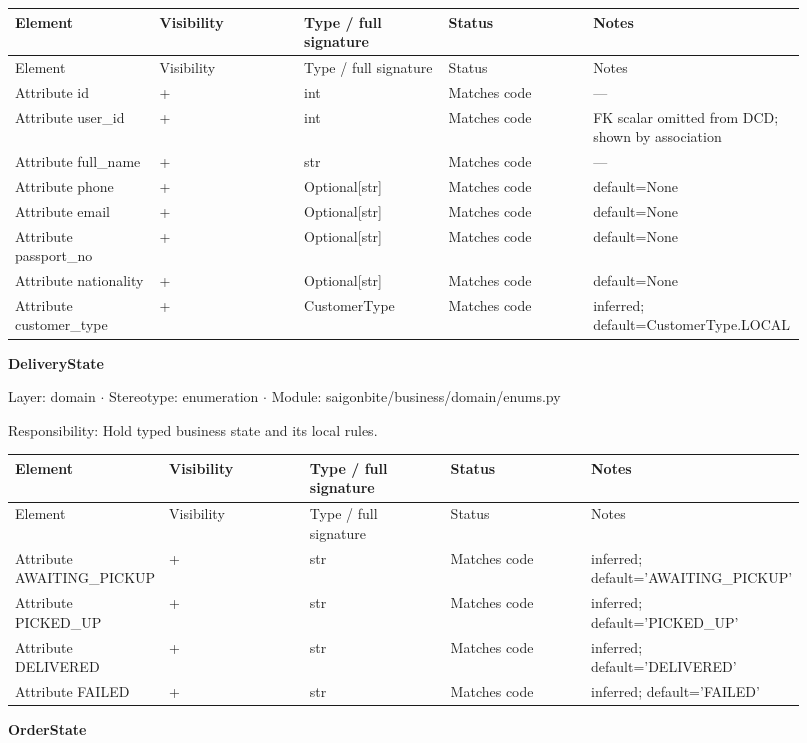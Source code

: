 \begin{longtable}{>{\raggedright\arraybackslash}p{0.1840\linewidth}>{\raggedright\arraybackslash}p{0.1840\linewidth}>{\raggedright\arraybackslash}p{0.1840\linewidth}>{\raggedright\arraybackslash}p{0.1840\linewidth}>{\raggedright\arraybackslash}p{0.1840\linewidth}}
Element & Visibility & Type / full signature & Status & Notes \\
\hline\endfirsthead
Element & Visibility & Type / full signature & Status & Notes \\
\hline\endhead
Attribute id & + & int & Matches code & --- \\
Attribute user\_id & + & int & Matches code & FK scalar omitted from DCD; shown by association \\
Attribute full\_name & + & str & Matches code & --- \\
Attribute phone & + & Optional[str] & Matches code & default=None \\
Attribute email & + & Optional[str] & Matches code & default=None \\
Attribute passport\_no & + & Optional[str] & Matches code & default=None \\
Attribute nationality & + & Optional[str] & Matches code & default=None \\
Attribute customer\_type & + & CustomerType & Matches code & inferred; default=CustomerType.LOCAL \\
\end{longtable}
\textbf{DeliveryState}

Layer: domain \ensuremath{\cdot} Stereotype: \guillemotleft{}enumeration\guillemotright{} \ensuremath{\cdot} Module: saigonbite/business/domain/enums.py

Responsibility: Hold typed business state and its local rules.

\begin{longtable}{>{\raggedright\arraybackslash}p{0.1840\linewidth}>{\raggedright\arraybackslash}p{0.1840\linewidth}>{\raggedright\arraybackslash}p{0.1840\linewidth}>{\raggedright\arraybackslash}p{0.1840\linewidth}>{\raggedright\arraybackslash}p{0.1840\linewidth}}
Element & Visibility & Type / full signature & Status & Notes \\
\hline\endfirsthead
Element & Visibility & Type / full signature & Status & Notes \\
\hline\endhead
Attribute AWAITING\_PICKUP & + & str & Matches code & inferred; default='AWAITING\_PICKUP' \\
Attribute PICKED\_UP & + & str & Matches code & inferred; default='PICKED\_UP' \\
Attribute DELIVERED & + & str & Matches code & inferred; default='DELIVERED' \\
Attribute FAILED & + & str & Matches code & inferred; default='FAILED' \\
\end{longtable}
\textbf{OrderState}

